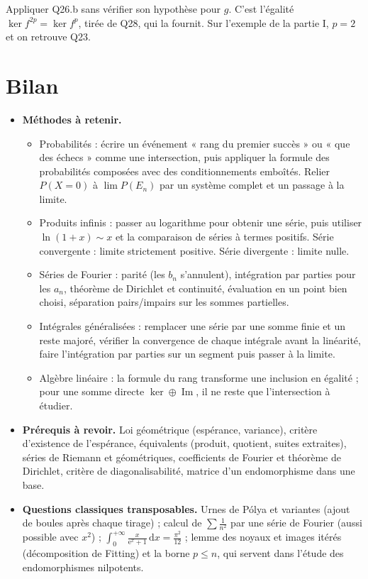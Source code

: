 \documentclass[11pt,a4paper]{article}
\providecommand{\tightlist}{\setlength{\itemsep}{0pt}\setlength{\parskip}{0pt}}
\begin{document}
\begin{piege}

Appliquer Q26.b sans vérifier son hypothèse pour \(g\). C'est l'égalité \(\ker f^{2p}=\ker f^p\), tirée de Q28, qui la fournit. Sur l'exemple de la partie I, \(p=2\) et on retrouve Q23.

\end{piege}

\hypertarget{bilan}{%
\section{Bilan}\label{bilan}}

\begin{itemize}
\tightlist
\item
  \textbf{Méthodes à retenir.}

  \begin{itemize}
  \tightlist
  \item
    Probabilités : écrire un événement « rang du premier succès » ou « que des échecs » comme une intersection, puis appliquer la formule des probabilités composées avec des conditionnements emboîtés. Relier \(P(X=0)\) à \(\lim P(E_n)\) par un système complet et un passage à la limite.
  \item
    Produits infinis : passer au logarithme pour obtenir une série, puis utiliser \(\ln(1+x)\sim x\) et la comparaison de séries à termes positifs. Série convergente : limite strictement positive. Série divergente : limite nulle.
  \item
    Séries de Fourier : parité (les \(b_n\) s'annulent), intégration par parties pour les \(a_n\), théorème de Dirichlet et continuité, évaluation en un point bien choisi, séparation pairs/impairs sur les sommes partielles.
  \item
    Intégrales généralisées : remplacer une série par une somme finie et un reste majoré, vérifier la convergence de chaque intégrale avant la linéarité, faire l'intégration par parties sur un segment puis passer à la limite.
  \item
    Algèbre linéaire : la formule du rang transforme une inclusion en égalité ; pour une somme directe \(\ker\oplus\operatorname{Im}\), il ne reste que l'intersection à étudier.
  \end{itemize}
\item
  \textbf{Prérequis à revoir.} Loi géométrique (espérance, variance), critère d'existence de l'espérance, équivalents (produit, quotient, suites extraites), séries de Riemann et géométriques, coefficients de Fourier et théorème de Dirichlet, critère de diagonalisabilité, matrice d'un endomorphisme dans une base.
\item
  \textbf{Questions classiques transposables.} Urnes de Pólya et variantes (ajout de boules après chaque tirage) ; calcul de \(\sum\frac1{n^2}\) par une série de Fourier (aussi possible avec \(x^2\)) ; \(\int_0^{+\infty}\frac{x}{\mathrm e^x+1}\,\mathrm dx=\frac{\pi^2}{12}\) ; lemme des noyaux et images itérés (décomposition de Fitting) et la borne \(p\le n\), qui servent dans l'étude des endomorphismes nilpotents.
\end{itemize}
\end{document}
